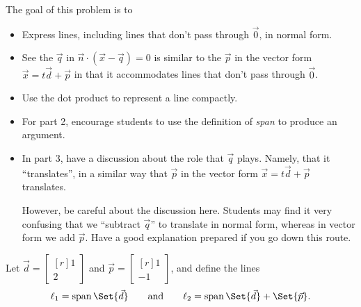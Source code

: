 \documentclass{problemset}
\DeclareMathOperator{\Span}{span}
\newcommand{\mat}[1]{\begin{bmatrix*}[r]#1\end{bmatrix*}}
\begin{document}
	\question
	\begin{annotation}
		\begin{goals}

			The goal of this problem is to
			\begin{itemize}
				\item Express lines, including lines that don't pass through $\vec 0$,
					in normal form.
				\item See the $\vec q$ in $\vec n\cdot (\vec x-\vec q)=0$ is similar
					to the $\vec p$ in the vector form $\vec x=t\vec d+\vec p$ in
					that it accommodates lines that don't pass through $\vec 0$.
				\item Use the dot product to represent a line compactly.
			\end{itemize}
		\end{goals}

		\begin{notes}
			\begin{itemize}
				\item For part 2, encourage students to use the definition of \emph{span}
					to produce an argument.
				\item In part 3, have a discussion about the role that $\vec q$ plays. Namely,
					that it ``translates'', in a similar way that $\vec p$ in the vector
					form $\vec x=t\vec d+\vec p$ translates.

					However, be careful about the discussion here. Students may find it very
					confusing that we ``subtract $\vec q$'' to translate in normal form, whereas in
					vector form we add $\vec p$. Have a good explanation prepared if you go
					down this route.
			\end{itemize}
		\end{notes}
	\end{annotation}
	Let $\vec d=\mat{1\\2}$ and $\vec p=\mat{1\\-1}$, and define the lines
	\[
		\ell_1 = \Span\Set{\vec d}\qquad\text{and}\qquad \ell_2=\Span\Set{\vec d}+\Set{\vec p}.
	\]
\end{document}
